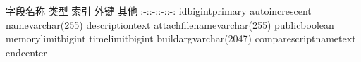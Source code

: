 {}\markdownRendererPipe{} 字段名称 \markdownRendererPipe{} 类型 \markdownRendererPipe{} 索引 \markdownRendererPipe{} 外键 \markdownRendererPipe{} 其他 \markdownRendererPipe{} \markdownRendererPipe{}:-:\markdownRendererPipe{}:-:\markdownRendererPipe{}:-:\markdownRendererPipe{}:-:\markdownRendererPipe{} \markdownRendererPipe{}id\markdownRendererPipe{}bigint\markdownRendererPipe{}primary\markdownRendererPipe{}\markdownRendererPipe{} auto\markdownRendererBackslash{}\markdownRendererUnderscore{}increscent\markdownRendererPipe{} \markdownRendererPipe{}name\markdownRendererPipe{}varchar(255)\markdownRendererPipe{}\markdownRendererPipe{}\markdownRendererPipe{}\markdownRendererPipe{} \markdownRendererPipe{}description\markdownRendererPipe{}text\markdownRendererPipe{}\markdownRendererPipe{}\markdownRendererPipe{}\markdownRendererPipe{} \markdownRendererPipe{}attach\markdownRendererBackslash{}\markdownRendererUnderscore{}file\markdownRendererBackslash{}\markdownRendererUnderscore{}name\markdownRendererPipe{}varchar(255)\markdownRendererPipe{}\markdownRendererPipe{}\markdownRendererPipe{}\markdownRendererPipe{} \markdownRendererPipe{}public\markdownRendererPipe{}boolean\markdownRendererPipe{}\markdownRendererPipe{}\markdownRendererPipe{}\markdownRendererPipe{} \markdownRendererPipe{}memory\markdownRendererBackslash{}\markdownRendererUnderscore{}limit\markdownRendererPipe{}bigint\markdownRendererPipe{}\markdownRendererPipe{}\markdownRendererPipe{}\markdownRendererPipe{} \markdownRendererPipe{}time\markdownRendererBackslash{}\markdownRendererUnderscore{}limit\markdownRendererPipe{}bigint\markdownRendererPipe{}\markdownRendererPipe{}\markdownRendererPipe{}\markdownRendererPipe{} \markdownRendererPipe{}build\markdownRendererBackslash{}\markdownRendererUnderscore{}arg\markdownRendererPipe{}varchar(2047)\markdownRendererPipe{}\markdownRendererPipe{}\markdownRendererPipe{}\markdownRendererPipe{} \markdownRendererPipe{}compare\markdownRendererBackslash{}\markdownRendererUnderscore{}script\markdownRendererBackslash{}\markdownRendererUnderscore{}name\markdownRendererPipe{}text\markdownRendererPipe{}\markdownRendererPipe{}\markdownRendererPipe{}\markdownRendererPipe{}\markdownRendererInterblockSeparator
{}\markdownRendererBackslash{}end\markdownRendererLeftBrace{}center\markdownRendererRightBrace{}\relax